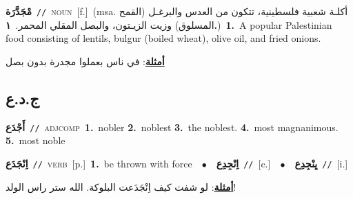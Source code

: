 \documentclass[10pt,a4paper,twoside]{article} %
\begin{document}
\begin{multicols}{2}
{\setlength\topsep{0pt}\textbf{\foreignlanguage{arabic}{مْجَدَّرَة}}\ {\color{gray}\texttt{//}\color{black}}\ \textsc{noun}\ [f.]\ \color{gray}(msa. \foreignlanguage{arabic}{أكلـة شعبية فلسطينية، تتكون من العدس والبرغـل (القمح المسلوق) وزيت الزيـتون، والبصل المقلي المحمر.}~\foreignlanguage{arabic}{\textbf{١.}})\color{black}\ \textbf{1.}~A popular Palestinian food consisting of lentils, bulgur (boiled wheat), olive oil, and fried onions.\  \begin{flushright}\color{gray}\foreignlanguage{arabic}{\textbf{\underline{\foreignlanguage{arabic}{أمثلة}}}: في ناس بعملوا مجدرة بدون بصل}\end{flushright}\color{black}} \vspace{2mm}

\vspace{-3mm}
\subsection*{\color{blue}\foreignlanguage{arabic}{ج.د.ع}\color{blue}{}} 

{\setlength\topsep{0pt}\textbf{\foreignlanguage{arabic}{أَجْدَع}}\ {\color{gray}\texttt{//}\color{black}}\ \textsc{adj\textunderscore comp}\ \textbf{1.}~nobler  \textbf{2.}~noblest  \textbf{3.}~the noblest.  \textbf{4.}~most magnanimous.  \textbf{5.}~most noble\ } \vspace{2mm}

{\setlength\topsep{0pt}\textbf{\foreignlanguage{arabic}{اِنْجَدَع}}\ {\color{gray}\texttt{//}\color{black}}\ \textsc{verb}\ [p.]\ \textbf{1.}~be thrown with force\ \ $\bullet$\ \ \setlength\topsep{0pt}\textbf{\foreignlanguage{arabic}{اِنْجِدِع}}\ {\color{gray}\texttt{//}\color{black}}\ [c.]\ \ $\bullet$\ \ \setlength\topsep{0pt}\textbf{\foreignlanguage{arabic}{يِنْجِدِع}}\ {\color{gray}\texttt{//}\color{black}}\ [i.]\  \begin{flushright}\color{gray}\foreignlanguage{arabic}{\textbf{\underline{\foreignlanguage{arabic}{أمثلة}}}: لو شفت كيف اِنْجَدَعت البلوكة. الله ستر راس الولد!}\end{flushright}\color{black}} \vspace{2mm}


\end{multicols}
\end{document}
